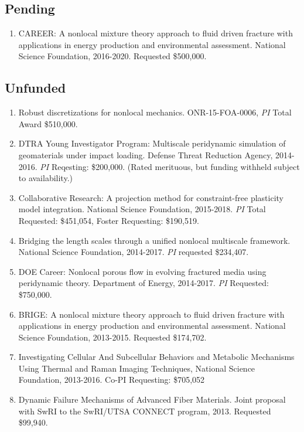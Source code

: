 \subsection*{Pending}

\begin{enumerate}
    \item CAREER: A nonlocal mixture theory approach to fluid driven fracture with applications in energy production and environmental assessment. National Science Foundation, 2016-2020. Requested \$500,000.
\end{enumerate}

\subsection*{Unfunded}

\begin{enumerate}
    \item Robust discretizations for nonlocal mechanics. ONR-15-FOA-0006, \textit{PI} Total Award {\$}510,000.
  \item DTRA Young Investigator Program: Multiscale peridynamic simulation of geomaterials under impact loading. Defense Threat Reduction Agency, 2014-2016. \textit{PI} Reqesting: \$200,000. (Rated merituous, but funding withheld subject to availability.)
  \item Collaborative Research: A projection method for constraint-free plasticity model integration. National Science Foundation, 2015-2018. \textit{PI} Total Requested: \$451,054, Foster Requesting: \$190,519.
    \item Bridging the length scales through a unified nonlocal multiscale framework. National Science Foundation, 2014-2017. \textit{PI} requested \$234,407.
    \item DOE Career: Nonlocal porous flow in evolving fractured media using peridynamic theory. Department of Energy, 2014-2017. \textit{PI} Requested: \$750,000. 
    \item BRIGE: A nonlocal mixture theory approach to fluid driven fracture with applications in energy production and environmental assessment. National Science Foundation, 2013-2015. Requested \$174,702.
    \item  Investigating Cellular And Subcellular Behaviors and Metabolic Mechanisms Using Thermal and Raman Imaging Techniques, National Science Foundation, 2013-2016.  Co-PI Requesting: \$705,052
    \item Dynamic Failure Mechanisms of Advanced Fiber Materials. Joint proposal with SwRI to the SwRI/UTSA CONNECT program, 2013. Requested \$99,940.

\end{enumerate}
